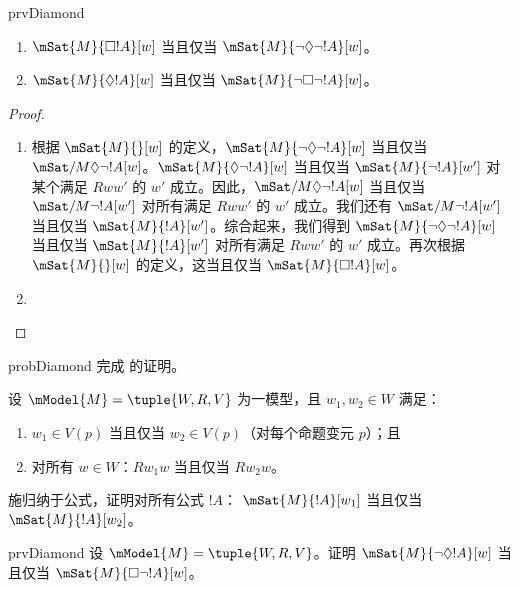 \documentclass[../../../include/open-logic-section]{subfiles}
\begin{document}
\begin{tagblock}{prvDiamond}
\begin{prop}
  \begin{enumerate}
  \item $\mSat{M}{\Box !A}[w]$ 当且仅当 $\mSat{M}{\lnot\Diamond\lnot !A}[w]$。
  \item $\mSat{M}{\Diamond !A}[w]$ 当且仅当 $\mSat{M}{\lnot\Box\lnot !A}[w]$。
  \end{enumerate}
\end{prop}

\begin{proof}
  \begin{enumerate}
    \item 根据 $\mSat{M}{}[w]$ 的定义，$\mSat{M}{\lnot\Diamond\lnot !A}[w]$ 当且仅当 $\mSat/{M}{\Diamond\lnot
      !A}[w]$。$\mSat{M}{\Diamond\lnot
      !A}[w]$ 当且仅当 $\mSat{M}{\lnot
      !A}[w']$ 对某个满足 $Rww'$ 的 $w'$ 成立。因此，$\mSat/{M}{\Diamond\lnot !A}[w]$ 当且仅当 $\mSat/{M}{\lnot !A}[w']$ 对所有满足 $Rww'$ 的 $w'$ 成立。我们还有
    $\mSat/{M}{\lnot !A}[w']$ 当且仅当 $\mSat{M}{!A}[w']$。综合起来，我们得到
    $\mSat{M}{\lnot\Diamond\lnot !A}[w]$ 当且仅当 $\mSat{M}{!A}[w']$ 对所有满足 $Rww'$ 的 $w'$ 成立。再次根据 $\mSat{M}{}[w]$ 的定义，这当且仅当 $\mSat{M}{\Box !A}[w]$。
    \item {}
  \end{enumerate}
\end{proof}

\begin{probtag}{probDiamond}
  完成  的证明。
\end{probtag}
\end{tagblock}

\begin{prob}
  设 $\mModel{M} = \tuple{W, R, V}$ 为一模型，且 $w_1, w_2 \in W$ 满足：
  \begin{enumerate}
  \item $w_1 \in V(p)$ 当且仅当 $w_2 \in V(p)$（对每个命题变元 $p$）；且
  \item 对所有 $w \in W$：$Rw_1w$ 当且仅当 $Rw_2w$。
  \end{enumerate}
  施归纳于公式，证明对所有公式 $!A$：
  $\mSat{M}{!A}[w_1]$ 当且仅当 $\mSat{M}{!A}[w_2]$。
\end{prob}

\begin{probtag}{prvDiamond}
  设 $\mModel{M} = \tuple{W, R, V}$。证明
  $\mSat{M}{\lnot\Diamond !A}[w]$ 当且仅当
  $\mSat{M}{\Box\lnot!A}[w]$。
\end{probtag}
\end{document}
